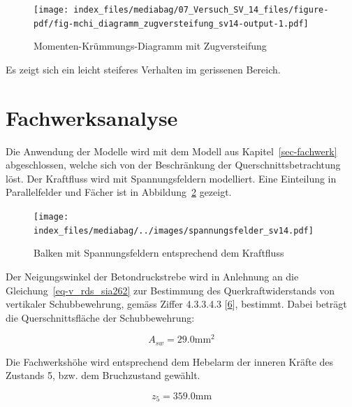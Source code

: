 \documentclass[
  12pt,
  letterpaper,
  egregdoesnotlikesansseriftitles]{scrreprt}
\begin{document}
\begin{figure}[H]

{\centering \texttt{[image: index\_files/mediabag/07\_Versuch\_SV\_14\_files/figure-pdf/fig-mchi\_diagramm\_zugversteifung\_sv14-output-1.pdf]}

}

\caption{\label{fig-mchi_diagramm_zugversteifung_sv14}Momenten-Krümmungs-Diagramm
mit Zugversteifung}

\end{figure}

Es zeigt sich ein leicht steiferes Verhalten im gerissenen Bereich.

\hypertarget{fachwerksanalyse-1}{%
\section{Fachwerksanalyse}\label{fachwerksanalyse-1}}

Die Anwendung der Modelle wird mit dem Modell aus
Kapitel~\ref{sec-fachwerk} abgeschlossen, welche sich von der
Beschränkung der Querschnittsbetrachtung löst. Der Kraftfluss wird mit
Spannungsfeldern modelliert. Eine Einteilung in Parallelfelder und
Fächer ist in Abbildung~\ref{fig-spannungsfelder_sv14} gezeigt.

\begin{figure}[H]

{\centering \texttt{[image: index\_files/mediabag/../images/spannungsfelder\_sv14.pdf]}

}

\caption{\label{fig-spannungsfelder_sv14}Balken mit Spannungsfeldern
entsprechend dem Kraftfluss}

\end{figure}

Der Neigungswinkel der Betondruckstrebe wird in Anlehnung an die
Gleichung~\ref{eq-v_rds_sia262} zur Bestimmung des Querkraftwiderstands
von vertikaler Schubbewehrung, gemäss Ziffer 4.3.3.4.3
{[}\protect\hyperlink{ref-SIA2013a}{6}{]}, bestimmt. Dabei beträgt die
Querschnittsfläche der Schubbewehrung:

\begin{equation}A_{s w} = 29.0 \text{mm}^{2}\end{equation}

Die Fachwerkshöhe wird entsprechend dem Hebelarm der inneren Kräfte des
Zustands 5, bzw. dem Bruchzustand gewählt.

\begin{equation}z_{5} = 359.0 \text{mm}\end{equation}
\end{document}

